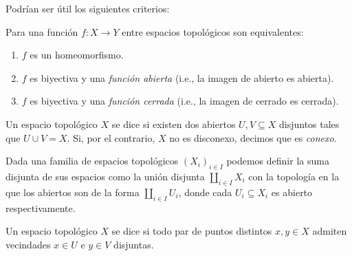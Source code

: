 \documentclass[11pt, reqno]{amsart}
\begin{document}
Podrían ser útil los siguientes criterios:
\begin{prop}
	Para una función $f \colon X \to Y$ entre espacios topológicos son equivalentes:
	\begin{enumerate}
		\item $f$ es un homeomorfismo.
		\item $f$ es biyectiva y una \emph{función abierta} (i.e., la imagen de abierto es abierta).
		\item $f$ es biyectiva y una \emph{función cerrada} (i.e., la imagen de cerrado es cerrada).
	\end{enumerate}
\end{prop}

Un espacio topológico $X$ se dice  si existen dos abiertos $U, V \subseteq X$ disjuntos tales que $U
\cup V = X$.
Si, por el contrario, $X$ no es disconexo, decimos que es \emph{conexo}.

Dada una familia de espacios topológicos $(X_i)_{i\in I}$ podemos definir la suma disjunta de sus espacios como la unión
disjunta $\coprod_{i\in I} X_i$ con la topología en la que los abiertos son de la forma $\coprod_{i\in I} U_i$, donde
cada $U_i \subseteq X_i$ es abierto respectivamente.

Un espacio topológico $X$ se dice  si todo par de puntos distintos $x, y \in X$ admiten vecindades
$x \in U$ e $y \in V$ disjuntas.

\newpage
\end{document}
